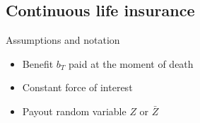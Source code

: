 \subsection{Continuous life insurance}

Assumptions and notation
\begin{itemize}
\item Benefit $b_T$ paid at the moment of death
\item Constant force of interest
\item Payout random variable $Z$ or $\bar{Z}$
\end{itemize}